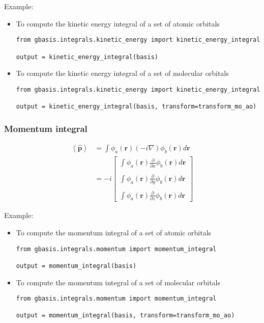 \documentclass[letterpaper]{article}
\begin{document}
Example:
\begin{itemize}
\item To compute the kinetic energy integral of a set of atomic orbitals
  \begin{lstlisting}[xleftmargin=-25pt]
from gbasis.integrals.kinetic_energy import kinetic_energy_integral

output = kinetic_energy_integral(basis)
\end{lstlisting}
\item To compute the kinetic energy integral of a set of molecular orbitals
  \begin{lstlisting}[xleftmargin=-25pt]
from gbasis.integrals.kinetic_energy import kinetic_energy_integral

output = kinetic_energy_integral(basis, transform=transform_mo_ao)
\end{lstlisting}
\end{itemize}
\subsubsection{Momentum integral}
\begin{equation}
  \label{eq:momentum}
  \begin{split}
    \left< \hat{\mathbf{p}} \right>
    &= \int \phi_a(\mathbf{r}) \left( -i \nabla \right) \phi_b(\mathbf{r}) d\mathbf{r}\\
    &= -i
    \begin{bmatrix}
      \int \phi_a(\mathbf{r}) \frac{\partial}{\partial x} \phi_b(\mathbf{r}) d\mathbf{r}\\\\
      \int \phi_a(\mathbf{r}) \frac{\partial}{\partial y} \phi_b(\mathbf{r}) d\mathbf{r}\\\\
      \int \phi_a(\mathbf{r}) \frac{\partial}{\partial z} \phi_b(\mathbf{r}) d\mathbf{r}
    \end{bmatrix}
  \end{split}
\end{equation}

Example:
\begin{itemize}
\item To compute the momentum integral of a set of atomic orbitals
  \begin{lstlisting}[xleftmargin=-25pt]
from gbasis.integrals.momentum import momentum_integral

output = momentum_integral(basis)
\end{lstlisting}
\item To compute the momentum integral of a set of molecular orbitals
  \begin{lstlisting}[xleftmargin=-25pt]
from gbasis.integrals.momentum import momentum_integral

output = momentum_integral(basis, transform=transform_mo_ao)
\end{lstlisting}
\end{itemize}
\end{document}
